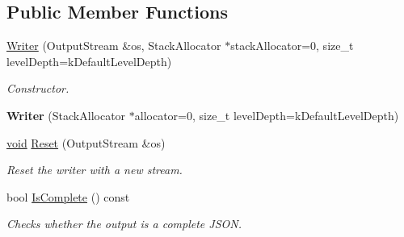 \subsection*{Public Member Functions}
\begin{DoxyCompactItemize}
\item 
\hyperlink{class_writer_a27998a2e0fcb0aa23c95e1330b340abc}{Writer} (Output\+Stream \&os, Stack\+Allocator $\ast$stack\+Allocator=0, size\+\_\+t level\+Depth=k\+Default\+Level\+Depth)
\begin{DoxyCompactList}\small\item\em Constructor. \end{DoxyCompactList}\item 
\hypertarget{class_writer_a2a6c946bc2a9dcfdda9f958c3cfee66c}{}{\bfseries Writer} (Stack\+Allocator $\ast$allocator=0, size\+\_\+t level\+Depth=k\+Default\+Level\+Depth)\label{class_writer_a2a6c946bc2a9dcfdda9f958c3cfee66c}

\item 
\hyperlink{_s_d_l__audio_8h_a52835ae37c4bb905b903cbaf5d04b05f}{void} \hyperlink{class_writer_a4e5bd5e6364edca476125b511b3dca9c}{Reset} (Output\+Stream \&os)
\begin{DoxyCompactList}\small\item\em Reset the writer with a new stream. \end{DoxyCompactList}\item 
bool \hyperlink{class_writer_aced42429d1b31a565c5ca0310bf4e276}{Is\+Complete} () const 
\begin{DoxyCompactList}\small\item\em Checks whether the output is a complete J\+S\+O\+N. \end{DoxyCompactList}\end{DoxyCompactItemize}
